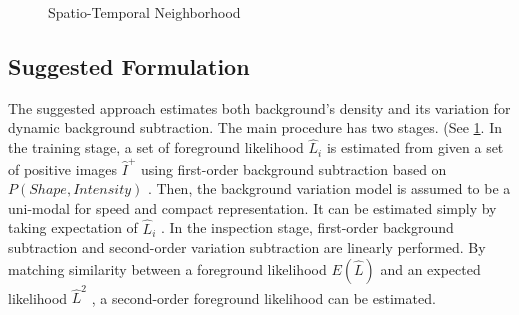 \documentclass[conference]{IEEEtran}
\begin{document}
\begin{figure}[!t]
  \centering
  \label{fig:40}
  \hfill
  \caption{Spatio-Temporal Neighborhood}
\end{figure}


\subsection{Suggested Formulation}
The suggested approach estimates both background's density and its variation for dynamic background subtraction. The main procedure has two stages. (See \ref{fig:40}. In the training stage, a set of foreground likelihood \begin{math} \hat{L}_i \end{math} is estimated from given a set of positive images \begin{math} \hat{I}^+ \end{math}  using first-order background subtraction based on \begin{math} P(Shape, Intensity) \end{math} . Then, the background variation model is assumed to be a uni-modal for speed and compact representation. It can be estimated simply by taking expectation of \begin{math} \hat{L}_i \end{math} . In the inspection stage, first-order background subtraction and second-order variation subtraction are linearly performed. By matching similarity between a foreground likelihood \begin{math} E(\hat{L}) \end{math}  and an expected likelihood \begin{math} \hat{L}^2 \end{math} , a second-order foreground likelihood   can be estimated.
\end{document}
